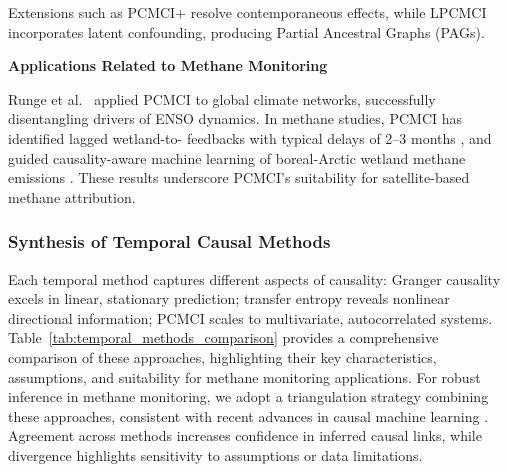Extensions such as PCMCI+ resolve contemporaneous effects, while LPCMCI incorporates latent confounding, producing Partial Ancestral Graphs (PAGs).

\textbf{Applications Related to Methane Monitoring}

Runge et al.~\cite{Runge2019_2} applied PCMCI to global climate networks, successfully disentangling drivers of ENSO dynamics. In methane studies, PCMCI has identified lagged wetland-to- feedbacks with typical delays of 2–3 months \cite{Krich2020}, and guided causality-aware machine learning of boreal-Arctic wetland methane emissions \cite{Knox2024}. These results underscore PCMCI's suitability for satellite-based methane attribution.

\subsubsection{Synthesis of Temporal Causal Methods}

Each temporal method captures different aspects of causality: Granger causality excels in linear, stationary prediction; transfer entropy reveals nonlinear directional information; PCMCI scales to multivariate, autocorrelated systems. Table~\ref{tab:temporal_methods_comparison} provides a comprehensive comparison of these approaches, highlighting their key characteristics, assumptions, and suitability for methane monitoring applications. For robust inference in methane monitoring, we adopt a triangulation strategy combining these approaches, consistent with recent advances in causal machine learning \cite{Kaddour2022}. Agreement across methods increases confidence in inferred causal links, while divergence highlights sensitivity to assumptions or data limitations.

